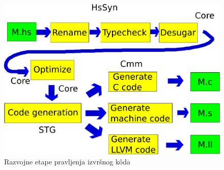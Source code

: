 \begin{figure}[h!]
	\begin{center}
		\includegraphics[scale=0.30]{resources/razvojneEtape.png}
	\end{center}
	\caption{Razvojne etape pravljenja izvršnog k\^{o}da}
	\label{fig:razvojneEtaple}
\end{figure}